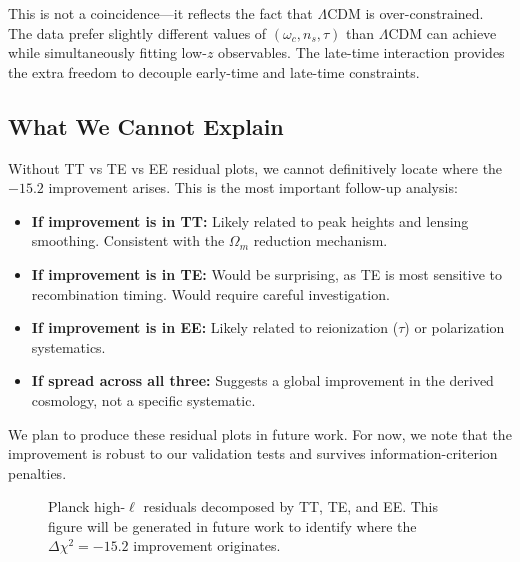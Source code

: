 \documentclass[twocolumn,showpacs,preprintnumbers,amsmath,amssymb,prd]{revtex4-2}
\begin{document}
This is not a coincidence---it reflects the fact that $\Lambda$CDM is over-constrained. The data prefer slightly different values of $(\omega_c, n_s, \tau)$ than $\Lambda$CDM can achieve while simultaneously fitting low-$z$ observables. The late-time interaction provides the extra freedom to decouple early-time and late-time constraints.

\subsection{What We Cannot Explain}

Without TT vs TE vs EE residual plots, we cannot definitively locate where the $-15.2$ improvement arises. This is the most important follow-up analysis:

\begin{itemize}
    \item \textbf{If improvement is in TT:} Likely related to peak heights and lensing smoothing. Consistent with the $\Omega_m$ reduction mechanism.
    \item \textbf{If improvement is in TE:} Would be surprising, as TE is most sensitive to recombination timing. Would require careful investigation.
    \item \textbf{If improvement is in EE:} Likely related to reionization ($\tau$) or polarization systematics.
    \item \textbf{If spread across all three:} Suggests a global improvement in the derived cosmology, not a specific systematic.
\end{itemize}

We plan to produce these residual plots in future work. For now, we note that the improvement is robust to our validation tests and survives information-criterion penalties.

\begin{figure}[h]
\centering
{}
\caption{Planck high-$\ell$ residuals decomposed by TT, TE, and EE. This figure will be generated in future work to identify where the $\Delta\chi^2 = -15.2$ improvement originates.}
\label{fig:residuals}
\end{figure}
\end{document}
